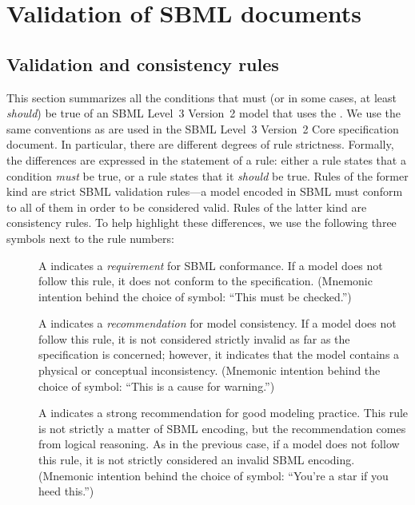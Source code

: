 
\section{Validation of SBML documents}
\label{apdx-validation}

\subsection{Validation and consistency rules}
\label{validation-rules}

This section summarizes all the conditions that must (or in some cases,
at least \emph{should}) be true of an SBML Level~3 Version~2 model that
uses the \DistributionsPackage. We use the same conventions as are used
in the SBML Level~3 Version~2 Core specification document. In
particular, there are different degrees of rule strictness. Formally,
the differences are expressed in the statement of a rule: either a rule
states that a condition \emph{must} be true, or a rule states that it
\emph{should} be true. Rules of the former kind are strict SBML
validation rules---a model encoded in SBML must conform to all of them
in order to be considered valid. Rules of the latter kind are
consistency rules. To help highlight these differences, we use the
following three symbols next to the rule numbers:

\begin{description}

\item[\hspace*{6.5pt}\vSymbol\vsp] A \vSymbolName indicates a
\emph{requirement} for SBML conformance. If a model does not follow this
rule, it does not conform to the \DistributionsPackage specification.
(Mnemonic intention behind the choice of symbol: ``This must be
checked.'')

\item[\hspace*{6.5pt}\cSymbol\csp] A \cSymbolName indicates a
\emph{recommendation} for model consistency. If a model does not follow
this rule, it is not considered strictly invalid as far as the
\DistributionsPackage specification is concerned; however, it indicates
that the model contains a physical or conceptual inconsistency.
(Mnemonic intention behind the choice of symbol: ``This is a cause for
warning.'')

\item[\hspace*{6.5pt}\mSymbol\msp] A \mSymbolName indicates a strong
recommendation for good modeling practice. This rule is not strictly a
matter of SBML encoding, but the recommendation comes from logical
reasoning. As in the previous case, if a model does not follow this
rule, it is not strictly considered an invalid SBML encoding. (Mnemonic
intention behind the choice of symbol: ``You're a star if you heed
this.'')

\end{description}

